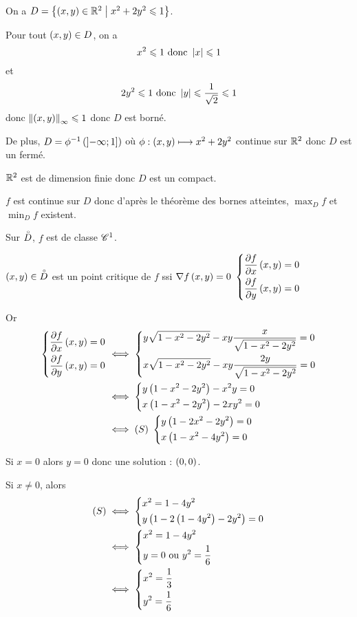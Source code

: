 \begin{corr}
On a \(D=\left\lbrace\left(x,y\right)\in\mathbb{R}^2\;\middle|\; x^2+2y^2\leqslant1\right\rbrace\).

Pour tout \(\left(x,y\right)\in D\), on a \[x^2\leqslant1\text{ donc }\left\lvert x\right\rvert\leqslant1\] et \[2y^2\leqslant1\text{ donc }\left\lvert y\right\rvert\leqslant\dfrac{1}{\sqrt{2}}\leqslant1\] donc \(\norme{\paren{x,y}}_\infty\leq1\) donc \(D\) est borné.

De plus, \(D=\phi^{-1}\left(\left]-\infty;1\right]\right)\) où \(\phi:\left(x,y\right)\longmapsto x^2+2y^2\) continue sur \(\mathbb{R}^2\) donc \(D\) est un fermé.

\(\mathbb{R}^2\) est de dimension finie donc \(D\) est un compact.

\(f\) est continue sur \(D\) donc d'après le théorème des bornes atteintes, \(\max_Df\) et \(\min_Df\) existent.

Sur \(\accentset{\circ}{D}\), \(f\) est de classe \(\mathscr{C}^{1}\).

\(\left(x,y\right)\in\accentset{\circ}{D}\) est un point critique de \(f\) ssi \(\nabla f\left(x,y\right)=0\) \ie \(\begin{dcases}
\pdv{f}{x}\left(x,y\right)=0 \\
\pdv{f}{y}\left(x,y\right)=0
\end{dcases}\)

Or \[\begin{aligned}
\begin{dcases}
\pdv{f}{x}\left(x,y\right)=0 \\
\pdv{f}{y}\left(x,y\right)=0
\end{dcases}&\iff\begin{dcases}
y\sqrt{1-x^2-2y^2}-xy\dfrac{x}{\sqrt{1-x^2-2y^2}}=0 \\
x\sqrt{1-x^2-2y^2}-xy\dfrac{2y}{\sqrt{1-x^2-2y^2}}=0
\end{dcases} \\
&\iff\begin{dcases}
y\left(1-x^2-2y^2\right)-x^2y=0 \\
x\left(1-x^2-2y^2\right)-2xy^2=0
\end{dcases} \\
&\iff\left(S\right)~\begin{dcases}
y\left(1-2x^2-2y^2\right)=0 \\
x\left(1-x^2-4y^2\right)=0
\end{dcases}
\end{aligned}\]

Si \(x=0\) alors \(y=0\) donc une solution : \(\left(0,0\right)\).

Si \(x\not=0\), alors \[\begin{aligned}
\left(S\right)&\iff\begin{dcases}
x^2=1-4y^2 \\
y\left(1-2\left(1-4y^2\right)-2y^2\right)=0
\end{dcases} \\
&\iff\begin{dcases}
x^2=1-4y^2 \\
y=0\text{ ou }y^2=\dfrac{1}{6}
\end{dcases} \\
&\iff\begin{dcases}
x^2=\dfrac{1}{3} \\
y^2=\dfrac{1}{6}
\end{dcases}
\end{aligned}\]


\end{corr}
